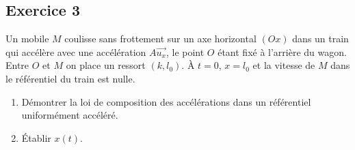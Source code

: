 \subsection{Exercice 3}

Un mobile $M$ coulisse sans frottement  sur un axe horizontal $(Ox)$ dans un train qui accélère avec une accélération $A\vec{u_x}$, le point $O$ étant fixé à l'arrière du wagon. Entre $O$ et $M$ on place un ressort $(k, l_0)$. À $t=0$, $x=l_0$ et la vitesse de $M$ dans le référentiel du train est nulle.

\begin{enumerate}
	\item Démontrer la loi de composition des accélérations dans un référentiel uniformément accéléré.
	\item Établir $x(t)$.
\end{enumerate}



